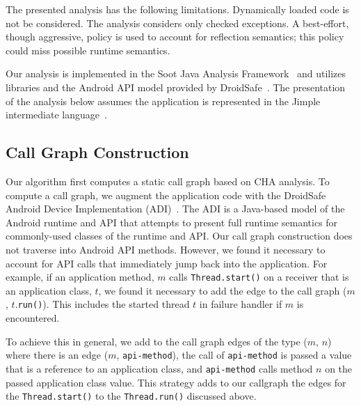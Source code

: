 The presented analysis has the following limitations. Dynamically
loaded code is not be considered.  The analysis considers only checked
exceptions.  A best-effort, though aggressive, policy is used to
account for reflection semantics; this policy could miss possible
runtime semantics.

Our analysis is implemented in the Soot Java Analysis
Framework~\cite{Vallee-Rai2000} and utilizes libraries and the Android
API model provided by
DroidSafe~\cite{Gordon:Kim:Perkins:Gilham:Nguyen:Rinard:NDSS15}. The
presentation of the analysis below assumes the application is
represented in the Jimple intermediate language~\cite{Vallee-Rai2000}.

\vspace{-0.05in}
\subsection{Call Graph Construction}


Our algorithm first computes a static call graph based on CHA
analysis. To compute a call graph, we augment the application code with the
DroidSafe Android Device Implementation
(ADI)~\cite{Gordon:Kim:Perkins:Gilham:Nguyen:Rinard:NDSS15}.  The ADI
is a Java-based model of the Android runtime and API that attempts to
present full runtime semantics for commonly-used classes of the
runtime and API.  Our call graph construction does not traverse into
Android API methods.  However, we found it necessary to account for
API calls that immediately jump back into the application.  For
example, if an application method, $m$ calls
\lstinline!Thread.start()! on a receiver that is an application class,
$t$, we found it necessary to add the edge to the call graph ($m$,
$t$.\lstinline!run()!).  This includes the started thread $t$ in
failure handler if $m$ is encountered.

To achieve this in general, we add to the call graph edges of the type
($m$, $n$) where there is an edge ($m$, \lstinline!api-method!), the
call of \lstinline!api-method! is passed a value that is a reference
to an application class, and \lstinline!api-method! calls method $n$
on the passed application class value.  This strategy adds to our
callgraph the edges for the \lstinline!Thread.start()! to the
\lstinline!Thread.run()! discussed above.

